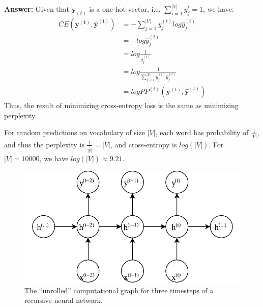 \documentclass[11pt]{article}
\begin{document}
\textbf{Answer:}
Given that $\mathbf{y}_{(t)}$ is a one-hot vector, i.e. $\sum_{i=1}^{|V|}y^{t}_{j} = 1$, we have:
\begin{equation*}
  \begin{split}
    CE(\mathbf{y^{(t)}}, \mathbf{\hat{y}^{(t)}})
    &= - \sum_{j=1}^{|V|}{ y_{j}^{(t)} log\hat{y}_{j}^{(t)} } \\
    &= - log\hat{y}_{j}^{(t)} \\
    &= log \frac{ 1 }{ \hat{y}_{j}^{(t)} } \\
    &= log \frac{ 1 }{ \sum_{j=1}^{|V|}{ y_{j}^{(t)} \hat{y}_{j}^{(t)} } } \\
    &= log PP^{(t)}(\mathbf{y}^{(t)}, \mathbf{\hat{y}}^{(t)})
  \end{split}
\end{equation*}
Thus, the result of minimizing cross-entropy loss is the same as minimizing perplexity.

For random predictions on vocabulary of size $|V|$, each word has probability of $\frac{1}{|V|}$, and thus the perplexity is $\frac{1}{\frac{1}{|V|}} = |V|$, and cross-entropy is $log(|V|)$. For $|V| = 10000$, we have $log(|V|) \approx 9.21$.

\begin{figure}[H]
  \centering
  \includegraphics[width=\textwidth*2/3]{RNN.pdf}

  \caption{The ``unrolled'' computational graph for three timesteps of a recursive neural network.}
  \label{fig:rnn-computation-graph}
\end{figure}
\end{document}
